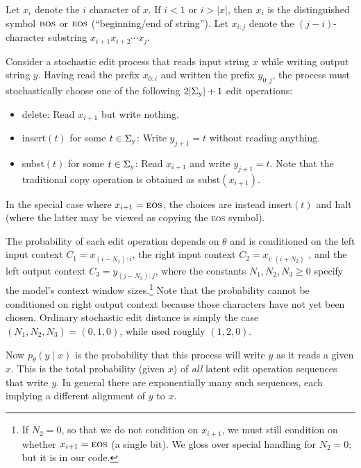 \documentclass[11pt,letterpaper]{article}
\newcommand{\Sigmay}{\Sigma_{\text y}}
\newcommand{\bos}{\textsc{bos}\xspace}
\newcommand{\eos}{\textsc{eos}\xspace}
\renewcommand{\th}{\raisebox{0.2\baselineskip}{\scriptsize th}\xspace}
\newcommand{\ptheta}{{p_\theta}}
\newcommand{\jason}[1]{\todo[color=blue!40,author=Jason]{#1}}
\newcommand{\violet}[1]{\todo[color=purple!40,author=Violet]{#1}}
\begin{document}
Let $x_i$ denote the $i$\th character of $x$.  If $i < 1$ or $i > |x|$,  
then $x_i$ is the distinguished symbol $\bos$ or $\eos$ (``beginning/end of string'').  Let $x_{i:j}$ denote the $(j-i)$-character substring $x_{i+1}x_{i+2}\cdots x_j$.

Consider a stochastic edit process that reads input string $x$ while writing output string $y$.  Having read the prefix $x_{0:i}$ and written the prefix $y_{0:j}$, the process must stochastically choose one of the following $2|\Sigmay|+1$ edit operations: 
\begin{itemize}[noitemsep]
\item {\sc delete}: Read $x_{i+1}$ but write nothing.
\item {\sc insert}$(t)$ for some $t \in \Sigmay$: Write $y_{j+1}=t$ without reading anything.
\item {\sc subst}$(t)$ for some $t \in \Sigmay$: Read $x_{i+1}$ and write $y_{j+1}=t$.  Note that the traditional {\sc copy} operation is obtained as
{\sc subst}$(x_{i+1})$.
\end{itemize}
In the special case where $x_{i+1}=\eos$, the choices are instead {\sc insert}$(t)$ and {\sc halt} (where the latter may be viewed as copying the \eos symbol).

The probability of each edit operation depends on $\theta$ and is conditioned on the left input context $C_1 = x_{(i-N_1):i}$, the right input context $C_2 = x_{i:(i+N_2)}$ %
, and the left output context $C_3 = y_{(j-N_3):j}$, where the constants $N_1, N_2, N_3 \geq 0$ specify the model's context window sizes.\footnote{\label{fn:eosbit}If $N_2=0$, so that we do not condition on $x_{i+1}$, we must still condition on whether $x_{i+1}=\eos$ (a single bit).  We gloss over special handling for $N_2=0$; but it is in our code.}
Note that the probability cannot be conditioned on right output context because those characters have not yet been chosen.
%
Ordinary stochastic edit distance \cite{ristad1998learning} is simply the case $(N_1,N_2,N_3)=(0,1,0)$, while  used roughly $(1,2,0)$.

Now $\ptheta(y \mid x)$ is the probability that this process will write $y$ as it reads a given $x$.  This is the total probability (given $x$) of {\em all} latent edit operation sequences that write $y$.  In general there are exponentially many such sequences, each implying a different alignment of $y$ to $x$.   
\end{document}
